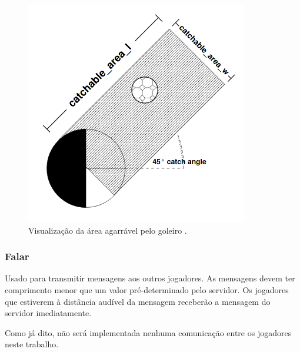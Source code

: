 \begin{figure}[H]
	\includegraphics[width=0.5\linewidth]{figs/catch.png}
	\centering
	\caption{Visualização da área agarrável pelo goleiro \cite{rcssmanual2003}.}
	\label{fig:catch}
\end{figure}

\subsubsection{Falar}

Usado para transmitir mensagens aos outros jogadores. As mensagens devem ter comprimento menor que um valor pré-determinado pelo servidor. Os jogadores que estiverem à distância audível da mensagem receberão a mensagem do servidor imediatamente.

Como já dito, não será implementada nenhuma comunicação entre os jogadores neste trabalho.

